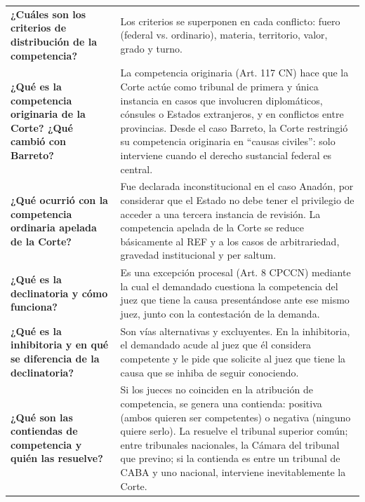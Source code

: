 \documentclass[12pt,oneside]{book}
\begin{document}
\begin{table}[H]
\begin{tabularx}{\textwidth}{
    >{\raggedright\arraybackslash}p{}
    >{\raggedright\arraybackslash}X
}
\textbf{¿Cuáles son los criterios de distribución de la competencia?} &
Los criterios se superponen en cada conflicto: fuero (federal vs. ordinario), materia, territorio, valor, grado y turno. \\

\textbf{¿Qué es la competencia originaria de la Corte? ¿Qué cambió con Barreto?} &
La competencia originaria (Art. 117 CN) hace que la Corte actúe como tribunal de primera y única instancia en casos que involucren diplomáticos, cónsules o Estados extranjeros, y en conflictos entre provincias. Desde el caso Barreto, la Corte restringió su competencia originaria en ``causas civiles'': solo interviene cuando el derecho sustancial federal es central. \\

\textbf{¿Qué ocurrió con la competencia ordinaria apelada de la Corte?} &
Fue declarada inconstitucional en el caso Anadón, por considerar que el Estado no debe tener el privilegio de acceder a una tercera instancia de revisión. La competencia apelada de la Corte se reduce básicamente al REF y a los casos de arbitrariedad, gravedad institucional y per saltum. \\

\textbf{¿Qué es la declinatoria y cómo funciona?} &
Es una excepción procesal (Art. 8 CPCCN) mediante la cual el demandado cuestiona la competencia del juez que tiene la causa presentándose ante ese mismo juez, junto con la contestación de la demanda. \\

\textbf{¿Qué es la inhibitoria y en qué se diferencia de la declinatoria?} &
Son vías alternativas y excluyentes. En la inhibitoria, el demandado acude al juez que él considera competente y le pide que solicite al juez que tiene la causa que se inhiba de seguir conociendo. \\

\textbf{¿Qué son las contiendas de competencia y quién las resuelve?} &
Si los jueces no coinciden en la atribución de competencia, se genera una contienda: positiva (ambos quieren ser competentes) o negativa (ninguno quiere serlo). La resuelve el tribunal superior común; entre tribunales nacionales, la Cámara del tribunal que previno; si la contienda es entre un tribunal de CABA y uno nacional, interviene inevitablemente la Corte. \\

\midrule


\end{tabularx}
\end{table}
\end{document}
